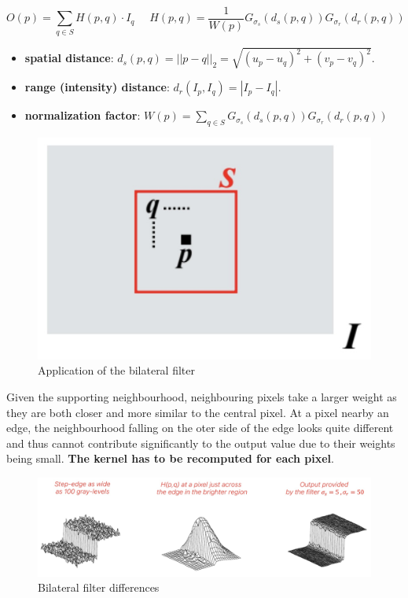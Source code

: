 $$O(p) = \sum_{q\in S} H(p,q) \cdot I_q \,\,\,\,\,\,\,\, H(p,q) = \frac{1}{W(p)} G_{\sigma_s}(d_s(p,q))G_{\sigma_r}(d_r(p,q))$$

\begin{itemize}
  \item \textbf{spatial distance}: $d_s(p,q) = ||p-q||_2 = \sqrt{(u_p - u_q)^2 + (v_p - v_q)^2}$.
  \item \textbf{range (intensity) distance}: $d_r(I_p, I_q) = |I_p - I_q|$.
  \item \textbf{normalization factor}: $W(p) = \sum_{q \in S} G_{\sigma_s}(d_s(p,q))G_{\sigma_r}(d_r(p,q))$
\end{itemize}

\begin{figure}[htbp]
  \centering
  \includegraphics[width=0.5\linewidth]{./img/bilateral_filter_application.jpg}
  \caption{Application of the bilateral filter}
  \label{fig:bilateral_filter_application}
\end{figure}

Given the supporting neighbourhood, neighbouring pixels take a larger weight as they are both closer and more similar to the central pixel.
At a pixel nearby an edge, the neighbourhood falling on the oter side of the edge looks quite different and thus cannot contribute significantly to the output value due to their weights being small.
\textbf{The kernel has to be recomputed for each pixel}.

\begin{figure}[htbp]
  \centering
  \includegraphics[width=0.9\linewidth]{./img/bilateral_filter.jpg}
  \caption{Bilateral filter differences}
  \label{fig:bilateral_filter}
\end{figure}

